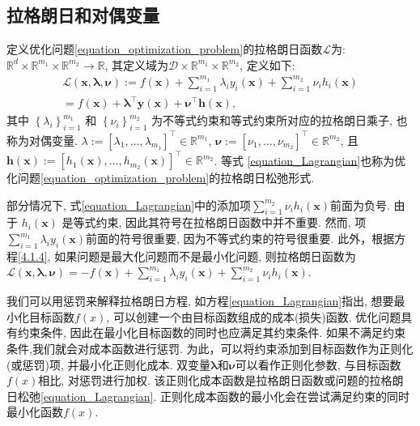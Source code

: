 \documentclass[lang=cn,10pt]{gorgeousnbook}
\numberwithin{equation}{section}%
\numberwithin{figure}{section}%
\begin{document}
\subsection{拉格朗日和对偶变量}
\begin{definition}
定义优化问题\eqref{equation_optimization_problem}的拉格朗日函数$\mathcal{L}$为: $\mathbb{R}^d\times\mathbb{R}^{m_1}\times\mathbb{R}^{m_2}\to\mathbb{R}$, 其定义域为$\mathcal{D}\times\mathbb{R}^{m_1}\times\mathbb{R}^{m_2}$, 定义如下:
\begin{equation}
	\begin{gathered}
		\mathcal{L}(\boldsymbol{x},\boldsymbol{\lambda},\boldsymbol{\nu}) :=f(\boldsymbol{x})+\sum_{i=1}^{m_1}\lambda_iy_i(\boldsymbol{x})+\sum_{i=1}^{m_2}\nu_ih_i(\boldsymbol{x}) \\
		=f(\boldsymbol{x})+\boldsymbol{\lambda}^\top\boldsymbol{y}(\boldsymbol{x})+\boldsymbol{\nu}^\top\boldsymbol{h}(\boldsymbol{x}), 
		\end{gathered} \label{equation_Lagrangian}
\end{equation}
其中 $\left\{ \lambda_i \right\} _{i=1}^{m_1}$ 和 $\left\{\nu_i \right\}_{i=1}^{m_2}$ 为不等式约束和等式约束所对应的拉格朗日乘子, 也称为对偶变量. $\lambda:=[\lambda_1,\ldots,\lambda_{m_1}]^\top \in \mathbb{R}^{m_1} $, $\boldsymbol{\nu} := [\nu_1,\ldots,\nu_{m_2}]^\top \in \mathbb{R}^{m_2}$, 且 $\boldsymbol{h}(\boldsymbol{x}):= [h_1(\boldsymbol{x}),\ldots,h_{m_2}(\boldsymbol{x})]^\top\in\mathbb{R}^{m_2}$. 等式 \eqref{equation_Lagrangian}也称为优化问题\eqref{equation_optimization_problem}的拉格朗日松弛形式. 
\end{definition}
\begin{note}
部分情况下, 式\eqref{equation_Lagrangian}中的添加项$\sum_{i=1}^{m_{2}}\nu_{i}h_{i}(\boldsymbol{x})$前面为负号. 由于 $h_i(\boldsymbol{x})$ 是等式约束, 因此其符号在拉格朗日函数中并不重要. 然而, 项$\sum_{i=1}^{m_1}\lambda_iy_i(\boldsymbol{x})$前面的符号很重要, 因为不等式约束的符号很重要. 此外，根据方程\eqref{4.1.4}, 如果问题是最大化问题而不是最小化问题, 则拉格朗日函数为$\mathcal{L}(\boldsymbol{x},\boldsymbol{\lambda},\boldsymbol{\nu})=-f(\boldsymbol{x})+\sum_{i=1}^{m_1}\lambda_iy_i(\boldsymbol{x})+\sum_{i=1}^{m_2}\nu_ih_i(\boldsymbol{x})$. 
\end{note}
\begin{note}
我们可以用惩罚来解释拉格朗日方程, 如方程\eqref{equation_Lagrangian}指出, 想要最小化目标函数$f(x)$, 可以创建一个由目标函数组成的成本(损失)函数. 优化问题具有约束条件, 因此在最小化目标函数的同时也应满足其约束条件. 如果不满足约束条件,我们就会对成本函数进行惩罚. 为此，可以将约束添加到目标函数作为正则化(或惩罚)项, 并最小化正则化成本. 双变量$\boldsymbol{\lambda }$和$\boldsymbol{\nu}$可以看作正则化参数, 与目标函数$f(x)$相比, 对惩罚进行加权. 该正则化成本函数是拉格朗日函数或问题的拉格朗日松弛\eqref{equation_Lagrangian}. 正则化成本函数的最小化会在尝试满足约束的同时最小化函数$f(x)$.
\end{note}
\end{document}
